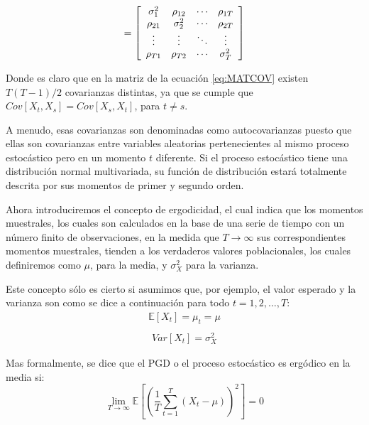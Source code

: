 \documentclass[
]{book}
\begin{document}
\begin{equation}
= \left[
    \begin{array}{c c c c}
    \sigma_1^2 & \rho_{12} & \cdots & \rho_{1T} \\
    \rho_{21} & \sigma_2^2 & \cdots & \rho_{2T} \\
    \vdots & \vdots & \ddots & \vdots \\
    \rho_{T1} & \rho_{T2} & \cdots & \sigma_T^2 \\
    \end{array}
\right]
    \label{eq:MATCOV}
\end{equation}

Donde es claro que en la matriz de la ecuación \eqref{eq:MATCOV} existen \(T(T-1)/2\) covarianzas distintas, ya que se cumple que \(Cov[X_t,X_s] = Cov[X_s,X_t]\), para \(t \neq s\).

A menudo, esas covarianzas son denominadas como autocovarianzas puesto que ellas son covarianzas entre variables aleatorias pertenecientes al mismo proceso estocástico pero en un momento \(t\) diferente. Si el proceso estocástico tiene una distribución normal multivariada, su función de distribución estará totalmente descrita por sus momentos de primer y segundo orden.

Ahora introduciremos el concepto de ergodicidad, el cual indica que los momentos muestrales, los cuales son calculados en la base de una serie de tiempo con un número finito de observaciones, en la medida que \(T \rightarrow \infty\) sus correspondientes momentos muestrales, tienden a los verdaderos valores poblacionales, los cuales definiremos como \(\mu\), para la media, y \(\sigma^2_X\) para la varianza.

Este concepto sólo es cierto si asumimos que, por ejemplo, el valor esperado y la varianza son como se dice a continuación para todo \(t = 1, 2, \ldots, T\):
\begin{eqnarray}
    \mathbb{E}[X_t] = \mu_t = \mu \\
    \label{MEDIA}
    \label{eq:ESPERANZA}
\end{eqnarray}
\begin{eqnarray}
    Var[X_t] = \sigma^2_X
    \label{eq:VARIANZA}
\end{eqnarray}

Mas formalmente, se dice que el PGD o el proceso estocástico es ergódico en la media si:
\begin{equation}
    \displaystyle\lim_{T \to \infty}{\mathbb{E} \left[ \left( \frac{1}{T} \sum^{T}_{t = 1} (X_t - \mu) \right) ^2 \right]} = 0
    \label{eq:LIM1}
\end{equation}
\end{document}
